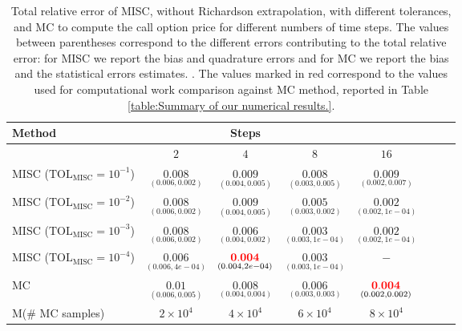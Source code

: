 \begin{table}[h!]
	\centering
	\begin{tabular}{l*{6}{c}r}
	\toprule[1.5pt]
	Method & & Steps  & &     \\
	\hline	
        & $2$ & $4$ & $8$ & $16$  \\
		\hline

		MISC ($\text{TOL}_{\text{MISC}}=10^{-1}$)  &  $\underset{(0.006,0.002)}{\mathbf{0.008}}$ & $\underset{(0.004,0.005)}{\mathbf{0.009}}$& $\underset{(0.003,0.005)}{\mathbf{ 0.008}}$ & $\underset{(0.002,0.007)}{\mathbf{ 0.009}}$   \\

		MISC ($\text{TOL}_{\text{MISC}}=10^{-2}$)  &  $\underset{(0.006,0.002)}{\mathbf{0.008}}$ & $\underset{(0.004,0.005)}{\mathbf{0.009}}$& $\underset{(0.003,0.002)}{\mathbf{ 0.005}}$ & $\underset{(0.002,1e-04)}{\mathbf{ 0.002}}$  \\
		MISC ($\text{TOL}_{\text{MISC}}=10^{-3}$)  &  $\underset{(0.006,0.002)}{\mathbf{0.008}}$& $\underset{(0.004,0.002)}{\mathbf{0.006}}$& $\underset{(0.003,1e-04)}{\mathbf{0.003}}$  & $\underset{(0.002,1e-04)}{\mathbf{ 0.002}}$  \\
		MISC ($\text{TOL}_{\text{MISC}}=10^{-4}$)  &  $\underset{(0.006,4e-04)}{\mathbf{0.006}}$ & $\underset{(0.004,2e-04)}{\mathbf{{\color{red}0.004}}}$& $\underset{(0.003,1e-04)}{\mathbf{0.003}}$ & $\mathbf{ -}$ \\

		
		\hline
		MC    & $\underset{(0.006,0.005)}{\mathbf{0.01}}$  & $\underset{(0.004,0.004)}{ \mathbf{0.008}}$  & $\underset{(0.003,0.003)}{\mathbf{0.006}}$ & $\underset{(0.002,0.002)}{\mathbf{{\color{red}0.004}}}$  \\	
		M(\# MC samples) 	& $2 \times 10^4$  & $4 \times 10^4$  & $6 \times 10^4$ & $8 \times 10^4$  \\
		\bottomrule[1.25pt]
	\end{tabular}
	\caption{Total relative error of MISC, without Richardson extrapolation, with different tolerances, and MC to compute the call option price  for different numbers of time steps. The values between parentheses correspond to the different errors contributing to the total relative error: for MISC we report the bias and quadrature errors and for MC we report the bias and the statistical errors estimates. . The values marked in red correspond to the values used for computational work comparison against MC method, reported in Table \ref{table:Summary of our numerical results.}.}
	\label{Total error of MISC and MC to compute Call option price of the different tolerances for different number of time steps. Case set 4, without Richardson extrapolation. The numbers between parentheses are the corresponding absolute errors.}
\end{table}

